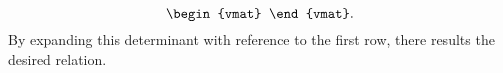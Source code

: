 \begin{exercises}
\begin{answer}
\begin{equation*}
\begin{vmat}
        \end{vmat}.
      \end{equation*}
      By expanding this determinant with reference to the first row, there
      results the desired relation.  
    \end{answer}
\end{exercises}
